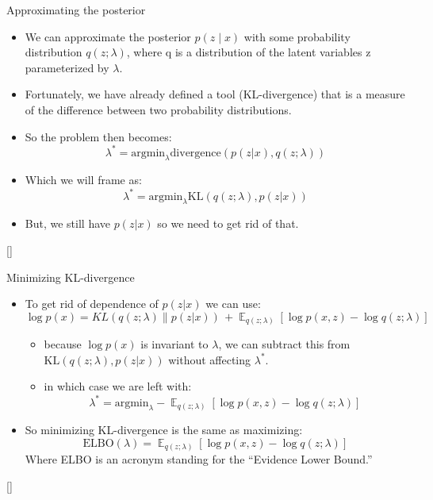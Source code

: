 \documentclass{beamer}
\begin{document}
\begin{frame}{Approximating the posterior}
  \begin{itemize}
  \item We can approximate the posterior $p(z \mid x)$ with some probability distribution $q(z ; \lambda)$, where q is a distribution of the latent variables z parameterized by $\lambda$.
  \item Fortunately, we have already defined a tool (KL-divergence) that is a measure of the difference between two probability distributions.
  \item So the problem then becomes:
    \[\lambda^* = \text{argmin}_\lambda \text{divergence}(p(z|x), q(z; \lambda))\]
  \item Which we will frame as:
    \[\lambda^* = \text{argmin}_\lambda \text{KL}(q(z; \lambda), p(z|x))\] %
  \item But, we still have $p(z|x)$ so we need to get rid of that.
  \end{itemize}
  [\cite{tran2016}]
\end{frame}

\begin{frame}{Minimizing KL-divergence}
  \begin{itemize}
  \item To get rid of dependence of $p(z|x)$ we can use:
    \[\log p(x) = KL(q(z; \lambda) \| p(z | x)) \, + \mathop{\mathbb{E}}_{q(z ; \lambda)} \left[\log p(x, z) - \log q(z ; \lambda) \right]\] %
    \begin{itemize}
    \item because $\log p(x)$ is invariant to $\lambda$, we can subtract this from $\text{KL}(q(z; \lambda), p(z|x))$ without affecting $\lambda^*$.
    \item in which case we are left with:
      \[\lambda^* = \text{argmin}_\lambda - \mathop{\mathbb{E}}_{q(z ; \lambda)} \left[\log p(x, z) - \log q(z ; \lambda) \right]\]
    \end{itemize}
  \item So minimizing KL-divergence is the same as maximizing:
    \[\text{ELBO}(\lambda) = \mathop{\mathbb{E}}_{q(z ; \lambda)} \left[\log p(x, z) - \log q(z ; \lambda) \right]\]
    Where ELBO is an acronym standing for the ``Evidence Lower Bound.''
        
  \end{itemize}
  [\cite{tran2016}]
\end{frame}
\end{document}
